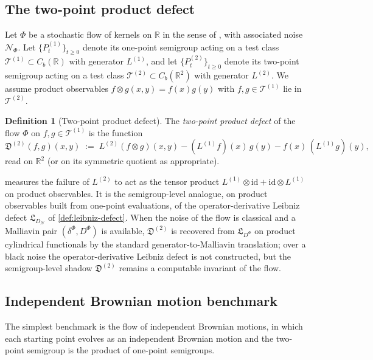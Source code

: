 \documentclass[11pt,reqno]{amsart}
\theoremstyle{plain}
\theoremstyle{definition}
\newtheorem{definition}[theorem]{Definition}
\theoremstyle{remark}
\newcommand{\R}{\mathbb{R}}
\begin{document}
\subsection{The two-point product defect}\label{sec:twopoint-def}

Let $\Phi$ be a stochastic flow of kernels on $\R$ in the sense of
\cite{LeJanRaimond2004}, with associated noise $\mathcal N_{\Phi}$.
Let $\{P_t^{(1)}\}_{t\ge 0}$ denote its one-point semigroup acting
on a test class $\mathcal T^{(1)}\subset C_b(\R)$ with generator
$L^{(1)}$, and let $\{P_t^{(2)}\}_{t\ge 0}$ denote its two-point
semigroup acting on a test class $\mathcal T^{(2)}\subset C_b(\R^2)$
with generator $L^{(2)}$. We assume product observables
$f\otimes g(x,y)=f(x)g(y)$ with $f,g\in\mathcal T^{(1)}$ lie in
$\mathcal T^{(2)}$.

\begin{definition}[Two-point product defect]\label{def:two-point-defect}
The \emph{two-point product defect} of the flow $\Phi$ on
$f,g\in\mathcal T^{(1)}$ is the function
\begin{equation}\label{eq:two-point-defect}
  \mathfrak D^{(2)}(f,g)(x,y)
  \;:=\;
  L^{(2)}(f\otimes g)(x,y)
  -(L^{(1)}f)(x)\,g(y)
  -f(x)\,(L^{(1)}g)(y),
\end{equation}
read on $\R^{2}$ (or on its symmetric quotient as appropriate).
\end{definition}

 measures the failure of $L^{(2)}$ to
act as the tensor product
$L^{(1)}\otimes\mathrm{id}+\mathrm{id}\otimes L^{(1)}$ on product
observables. It is the semigroup-level analogue, on product
observables built from one-point evaluations, of the
operator-derivative Leibniz defect $\mathfrak L_{D_{\mathcal N}}$
of \cref{def:leibniz-defect}. When the noise of the flow is
classical and a Malliavin pair $(\delta^{\Phi},D^{\Phi})$ is
available, $\mathfrak D^{(2)}$ is recovered from
$\mathfrak L_{D^{\Phi}}$ on product cylindrical functionals by the
standard generator-to-Malliavin translation; over a black noise the
operator-derivative Leibniz defect is not constructed, but the
semigroup-level shadow $\mathfrak D^{(2)}$ remains a computable
invariant of the flow.

\subsection{Independent Brownian motion benchmark}\label{sec:twopoint-indep}

The simplest benchmark is the flow of independent Brownian motions,
in which each starting point evolves as an independent Brownian
motion and the two-point semigroup is the product of one-point
semigroups.
\end{document}
